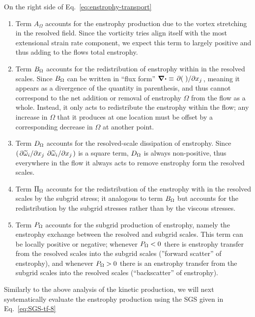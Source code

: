 On the right side of Eq.~\ref{eq:enstrophy-transport}
\begin{enumerate}
    \item   
        Term $A_{\Omega}$ accounts for the enstrophy production due to the vortex stretching in the
        resolved field. Since the vorticity tries align itself  with the most extensional strain
        rate component, we expect this term to largely positive and thus adding to the flows total
        enstrophy.
        
    \item
        Term $B_{\Omega}$ accounts for the redistribution of enstrophy within in the resolved scales.
        Since $B_{\Omega}$ can be written in ``flux form'' $\div \equiv \pdv*{(\;)}{x_{j}}$, meaning it
        appears as a divergence of the quantity in parenthesis, and thus cannot correspond to the
        net addition or removal of enstrophy $\Omega$ from the flow as a whole. Instead, it only
        acts to redistribute the enstrophy within the flow; any increase in $\Omega$ that it
        produces at one location must be offset by a corresponding decrease in $\Omega$ at another
        point.   

    \item
        Term $D_{\Omega}$ accounts for the resolved-scale dissipation of enstrophy. Since
        $\left(\pdv*{\widetilde{\omega}_{i}}{x_{j}} \pdv*{\widetilde{\omega}_{i}}{x_{j}}\right)$ is
        a square term, $D_{\Omega}$ is always non-positive, thus everywhere in the flow it always acts
        to remove enstrophy form the resolved scales.
       
    \item
        Term $\Pi_{\Omega}$ accounts for the redistribution of the enstrophy with in the resolved scales
        by the subgrid stress; it analogous to term $B_{\Omega}$ but accounts for the redistribution by
        the subgrid stresses rather than by the viscous stresses.

    \item
        Term $P_{\Omega}$ accounts for the subgrid production of enstrophy, namely the enstrophy
        exchange between the resolved and subgrid scales. This term can be locally positive or
        negative; whenever $P_{\Omega} < 0 $ there is enstrophy transfer from the resolved scales into
        the subgrid scales (''forward scatter'' of enstrophy), and whenever $P_{\Omega} >0$ there is an
        enstrophy transfer from the subgrid scales into the resolved scales (``backscatter'' of
        enstrophy).
\end{enumerate}

Similarly to the above analysis of the kinetic production, we will next 
systematically evaluate the enstrophy production using the SGS given in
Eq.~\ref{eq:SGS-tf-8} 


